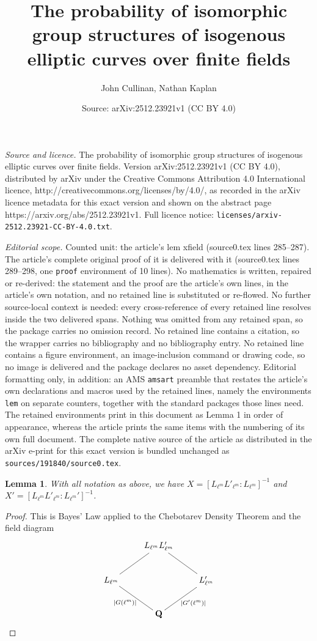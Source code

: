 \documentclass[10pt,a4paper]{amsart}
\title{The probability of isomorphic group structures of isogenous elliptic curves over finite fields}
\author{John Cullinan, Nathan Kaplan}
\date{Source: arXiv:2512.23921v1 (CC BY 4.0)}
\newtheorem{lem}{Lemma}
\newcommand{\Q}{\mathbf{Q}}
\begin{document}
\maketitle

\noindent\emph{Source and licence.} The probability of isomorphic group structures of isogenous elliptic curves over finite fields. Version arXiv:2512.23921v1 (CC BY 4.0), distributed by arXiv under the Creative Commons Attribution 4.0 International licence, http://creativecommons.org/licenses/by/4.0/, as recorded in the arXiv licence metadata for this exact version and shown on the abstract page https://arxiv.org/abs/2512.23921v1. Full licence notice: \texttt{licenses/arxiv-2512.23921-CC-BY-4.0.txt}.\par\smallskip

\noindent\textit{Editorial scope.} Counted unit: the article's lem xfield (source0.tex lines 285--287). The article's complete original proof of it is delivered with it (source0.tex lines 289--298, one \texttt{proof} environment of 10 lines). No mathematics is written, repaired or re-derived: the statement and the proof are the article's own lines, in the article's own notation, and no retained line is substituted or re-flowed.  No further source-local context is needed: every cross-reference of every retained line resolves inside the two delivered spans.  Nothing was omitted from any retained span, so the package carries no omission record.  No retained line contains a citation, so the wrapper carries no bibliography and no bibliography entry.  No retained line contains a figure environment, an image-inclusion command or drawing code, so no image is delivered and the package declares no asset dependency.  Editorial formatting only, in addition: an AMS \texttt{amsart} preamble that restates the article's own declarations and macros used by the retained lines, namely the environments \texttt{lem} on separate counters, together with the standard packages those lines need.  The retained environments print in this document as Lemma 1 in order of appearance, whereas the article prints the same items with the numbering of its own full document.  The complete native source of the article as distributed in the arXiv e-print for this exact version is bundled unchanged as \texttt{sources/191840/source0.tex}.
\begin{lem}\label{xfield}
With all notation as above, we have $X = [L_{\ell^m}L'_{\ell^m}:L_{\ell^m}]^{-1}$ and $X' = [L_{\ell^m}L'_{\ell^m}:L_{\ell^m}']^{-1}$.
\end{lem}

\begin{proof}
This is Bayes' Law applied to the Chebotarev Density Theorem and the field diagram
\[
\xymatrix{
&L_{\ell^m}L'_{\ell^m} \ar@{-}[dl] \ar@{-}[dr] \\
L_{\ell^m} \ar@{-}_{|G(\ell^m)|}[dr]& & L'_{\ell^m} \ar@{-}^{|G'(\ell^m)|}[dl] \\
&\Q
}
\]
\end{proof}
\end{document}
